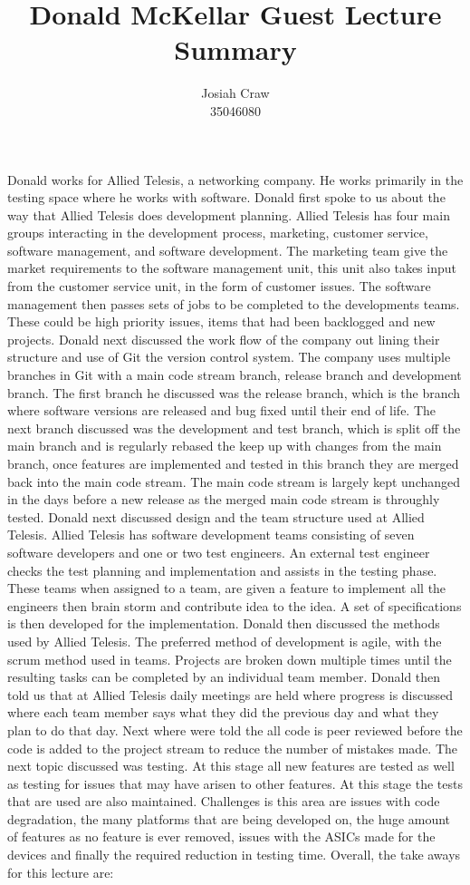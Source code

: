 \documentclass{article}
\title{Donald McKellar Guest Lecture Summary}
\author{Josiah Craw\\35046080}
\begin{document}
\maketitle

Donald works for Allied Telesis, a networking company. He works primarily in the testing space where
he works with software. Donald first spoke to us about the way that Allied Telesis does development
planning. Allied Telesis has four main groups interacting in the development process, marketing,
customer service, software management, and software development. The marketing team give the market
requirements to the software management unit, this unit also takes input from the customer service
unit, in the form of customer issues. The software management then passes sets of jobs to be
completed to the developments teams. These could be high priority issues, items that had been
backlogged and new projects. Donald next discussed the work flow of the company out lining their
structure and use of Git the version control system. The company uses multiple branches in Git with
a main code stream branch, release branch and development branch. The first branch he discussed was
the release branch, which is the branch where software versions are released and bug fixed until
their end of life. The next branch discussed was the development and test branch, which is split off
the main branch and is regularly rebased the keep up with changes from the main branch, once features
are implemented and tested in this branch they are merged back into the main code stream. The main
code stream is largely kept unchanged in the days before a new release as the merged main code
stream is throughly tested. Donald next discussed design and the team structure used at Allied
Telesis. Allied Telesis has software development teams consisting of seven software developers and
one or two test engineers. An external test engineer checks the test planning and implementation and
assists in the testing phase. These teams when assigned to a team, are given a feature to implement
all the engineers then brain storm and contribute idea to the idea. A set of specifications is then
developed for the implementation. Donald then discussed the methods used by Allied Telesis. The
preferred method of development is agile, with the scrum method used in teams. Projects are broken
down multiple times until the resulting tasks can be completed by an individual team member. Donald
then told us that at Allied Telesis daily meetings are held where progress is discussed where each
team member says what they did the previous day and what they plan to do that day. Next where were
told the all code is peer reviewed before the code is added to the project stream to reduce the
number of mistakes made. The next topic discussed was testing. At this stage all new features are
tested as well as testing for issues that may have arisen to other features. At this stage the tests
that are used are also maintained. Challenges is this area are issues with code degradation, the
many platforms that are being developed on, the huge amount of features as no feature is ever
removed, issues with the ASICs made for the devices and finally the required reduction in testing
time. Overall, the take aways for this lecture are:
\end{document}
